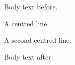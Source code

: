 \documentclass{article}
\begin{document}
Body text before.

\begin{center}
A centred line.

A second centred line.
\end{center}

Body text after.
\end{document}
